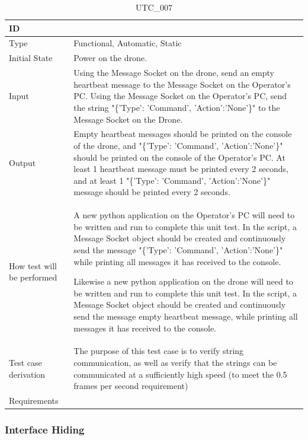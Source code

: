 \documentclass[12pt, titlepage]{article}
\begin{document}
\begin{table}[!h]
\begin{center}
\caption {UTC\_007}
\label{tab:UTC_007}
\begin{tabular}{ | m{3.2cm} | m{12.2cm} | } 
\hline
ID & \nameref{tab:UTC_007} \\ 
\hline
Type &  Functional, Automatic, Static  \\ 
\hline
Initial State & Power on the drone.\\ 
\hline
Input &  Using the Message Socket on the drone, send an empty heartbeat message to the Message Socket on the Operator's PC. Using the Message Socket on the Operator's PC, send the string "\{'Type': 'Command', 'Action':'None'\}" to the Message Socket on the Drone. \\ 
\hline
Output &  Empty heartbeat messages should be printed on the console of the drone, and  "\{'Type': 'Command', 'Action':'None'\}" should be printed on the console of the Operator's PC. At least 1 heartbeat message must be printed every 2 seconds, and at least 1 "\{'Type': 'Command', 'Action':'None'\}" message should be printed every 2 seconds. \\ 
\hline
How test will be performed & A new python application on the Operator's PC will need to be written and run to complete this unit test. In the script, a Message Socket object should be created and continuously send the message "\{'Type': 'Command', 'Action':'None'\}" while printing all messages it has received to the console.  

 Likewise a new python application on the drone will need to be written and run to complete this unit test. In the script, a Message Socket object should be created and continuously send the message empty heartbeat message, while printing all messages it has received to the console. \\ 
\hline
Test case derivation & The purpose of this test case is to verify string communication, as well as verify that the strings can be communicated at a sufficiently high speed (to meet the 0.5 frames per second requirement) \\ 
\hline
Requirements & \nameref{PERF_004} \\ 
\hline
\end{tabular}
\end{center}
\end{table}

\clearpage

\subsubsection{Interface Hiding}
\end{document}
